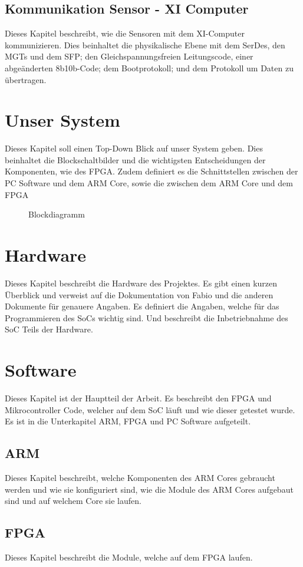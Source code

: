 \documentclass{article}
\begin{document}
\subsection{Kommunikation Sensor - XI Computer}
Dieses Kapitel beschreibt, wie die Sensoren mit dem XI-Computer kommunizieren. Dies beinhaltet die physikalische Ebene mit dem SerDes, den MGTs und dem SFP; den Gleichspannungsfreien Leitungscode, einer abgeänderten 8b10b-Code; dem Bootprotokoll; und dem Protokoll um Daten zu übertragen.

\section{Unser System}
Dieses Kapitel soll einen Top-Down Blick auf unser System geben. Dies beinhaltet die Blockschaltbilder und die wichtigsten Entscheidungen der Komponenten, wie des FPGA. Zudem definiert es die Schnittstellen zwischen der PC Software und dem ARM Core, sowie die zwischen dem ARM Core und dem FPGA

\begin{figure}[tb]
    \caption{Blockdiagramm}
    \label{fig:blockdiagramm}
\end{figure}

\section{Hardware}
Dieses Kapitel beschreibt die Hardware des Projektes. Es gibt einen kurzen Überblick und verweist auf die Dokumentation von Fabio und die anderen Dokumente für genauere Angaben. Es definiert die Angaben, welche für das Programmieren des SoCs wichtig sind. Und beschreibt die Inbetriebnahme des SoC Teils der Hardware.

\section{Software}
Dieses Kapitel ist der Hauptteil der Arbeit. Es beschreibt den FPGA und Mikrocontroller Code, welcher auf dem SoC läuft und wie dieser getestet wurde. Es ist in die Unterkapitel ARM, FPGA und PC Software aufgeteilt.
\subsection{ARM}
Dieses Kapitel beschreibt, welche Komponenten des ARM Cores gebraucht werden und wie sie konfiguriert sind, wie die Module des ARM Cores aufgebaut sind und auf welchem Core sie laufen.
\subsection{FPGA}
Dieses Kapitel beschreibt die Module, welche auf dem FPGA laufen.
\end{document}

